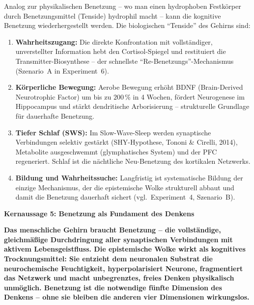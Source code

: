 ﻿\documentclass[12pt,a4paper]{report}
\theoremstyle{plain}
\theoremstyle{definition}
\theoremstyle{remark}
\begin{document}
	Analog zur physikalischen Benetzung -- wo man einen hydrophoben
	Festkörper durch Benetzungsmittel (Tenside) hydrophil macht --
	kann die kognitive Benetzung wiederhergestellt werden.
	Die biologischen ``Tenside'' des Gehirns sind:

	\begin{enumerate}[label=\textbf{(\arabic*)}]
		\item \textbf{Wahrheitszugang:} Die direkte Konfrontation mit
		vollständiger, unverstellter Information hebt den Cortisol-Spiegel
		und restituiert die Transmitter-Biosynthese -- der schnellste
		``Re-Benetzungs''-Mechanismus (Szenario~A in Experiment~6).

		\item \textbf{Körperliche Bewegung:} Aerobe Bewegung erhöht
		BDNF (Brain-Derived Neurotrophic Factor) um bis zu $200\,\%$
		in 4 Wochen, fördert Neurogenese im Hippocampus und
		stärkt dendritische Arborisierung -- strukturelle Grundlage für
		dauerhafte Benetzung.

		\item \textbf{Tiefer Schlaf (SWS):} Im Slow-Wave-Sleep werden
		synaptische Verbindungen selektiv gestärkt (SHY-Hypothese,
		Tononi \& Cirelli, 2014), Metabolite ausgeschwemmt
		(glymphatisches System) und der PFC regeneriert.
		Schlaf ist die nächtliche Neu-Benetzung des kortikalen Netzwerks.

		\item \textbf{Bildung und Wahrheitssuche:} Langfristig ist
		systematische Bildung der einzige Mechanismus, der die
		epistemische Wolke strukturell abbaut und damit die Benetzung
		dauerhaft sichert (vgl.\ Experiment~4, Szenario~B).
	\end{enumerate}

	\bigskip

	
	\noindent\textbf{Kernaussage 5: Benetzung als Fundament des Denkens}

		\textbf{Das menschliche Gehirn braucht Benetzung --
		die vollständige, gleichmäßige Durchdringung aller
		synaptischen Verbindungen mit aktivem Lebensgeistfluss.
		Die epistemische Wolke wirkt als kognitives Trocknungsmittel:
		Sie entzieht dem neuronalen Substrat die neurochemische Feuchtigkeit,
		hyperpolarisiert Neurone, fragmentiert das Netzwerk und
		macht unbegrenztes, freies Denken physikalisch unmöglich.
		Benetzung ist die notwendige fünfte Dimension des Denkens --
		ohne sie bleiben die anderen vier Dimensionen wirkungslos.}


\end{document}
